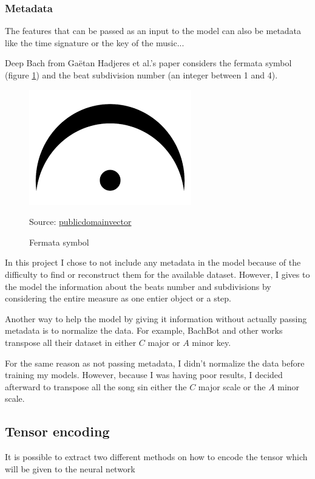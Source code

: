 \documentclass[12pt]{report}
\begin{document}
\subsubsection{Metadata}

The features that can be passed as an input to the model can also be metadata like the time signature or the key of the music...

Deep Bach from Gaëtan Hadjeres et al.'s paper \cite{hadjeres_deepbach:_2016} considers the fermata symbol (figure \ref{fig:fermata}) and the beat subdivision number (an integer between 1 and 4).

\begin{figure}[htbp]
     \centering
     \includegraphics[width=.1\linewidth]{images/music/symbols/fermata.png}
     \caption{Fermata symbol}
     Source: \href{https://publicdomainvectors.org/en/free-clipart/Music-symbol/70183.html}{publicdomainvector}
     \label{fig:fermata}
\end{figure}

In this project I chose to not include any metadata in the model because of the difficulty to find or reconstruct them for the available dataset.
However, I gives to the model the information about the beats number and subdivisions by considering the entire measure as one entier object or a step.

\bigskip

Another way to help the model by giving it information without actually passing metadata is to normalize the data.
For example, BachBot \cite{liang_automatic_2017} and other works \cite{chuan_modeling_nodate, boulanger-lewandowski_modeling_2012} transpose all their dataset in either $C$ major or $A$ minor key.

For the same reason as not passing metadata, I didn't normalize the data before training my models.
However, because I was having poor results, I decided afterward to transpose all the song sin either the $C$ major scale or the $A$ minor scale.

\subsection{Tensor encoding}

It is possible to extract two different methods on how to encode the tensor which will be given to the neural network
\end{document}
